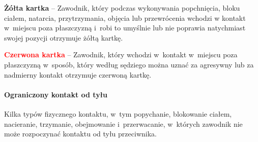 \documentclass[12pt]{article}
\newcommand\redcard[1]{\bgroup\textcolor{red}{\textbf{#1}}}
\newcommand\yellowcard[1]{\bgroup\textcolor{darkyellow}{\textbf{#1}}}
\begin{document}
\yellowcard{Żółta kartka} -- Zawodnik, który podczas wykonywania popchnięcia,
bloku ciałem, natarcia, przytrzymania, objęcia lub przewrócenia wchodzi
w kontakt w~miejscu poza płaszczyzną i~robi to umyślnie lub nie poprawia
natychmiast swojej pozycji otrzymuje żółtą kartkę.

\redcard{Czerwona kartka} -- Zawodnik, który wchodzi w~kontakt w~miejscu
poza płaszczyzną w~sposób, który według sędziego można uznać za
agresywny lub za nadmierny kontakt otrzymuje czerwoną kartkę.

\paragraph{Ograniczony kontakt od tyłu}

Kilka typów fizycznego kontaktu, w~tym popychanie, blokowanie ciałem,
nacieranie, trzymanie, obejmowanie i~przerwacanie, w~których zawodnik
nie może rozpoczynać kontaktu od tyłu przeciwnika.
\end{document}
